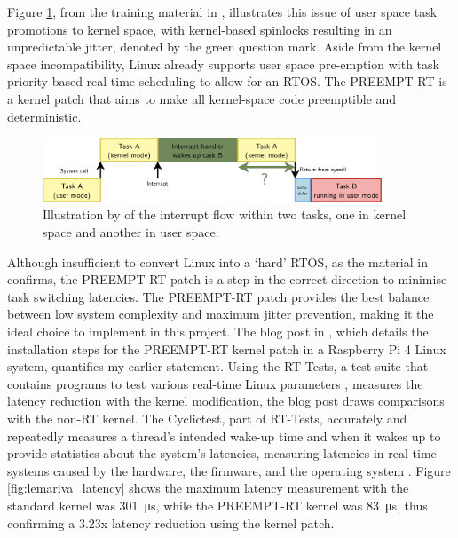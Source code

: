 Figure \ref{fig:bootlin_flow}, from the training material in \cite{bootlinUnderstandingLinuxRealtime2024}, illustrates this issue of user space task promotions to kernel space, with kernel-based spinlocks resulting in an unpredictable jitter, denoted by the green question mark. Aside from the kernel space incompatibility, Linux already supports user space pre-emption with task priority-based real-time scheduling to allow for an RTOS. The PREEMPT-RT is a kernel patch that aims to make all kernel-space code preemptible and deterministic.

\begin{figure}[h]
    \centering
    \includegraphics[width=0.9\textwidth]{assets/bootlin-interrupt-flow.png}
    \caption{Illustration by \cite{bootlinUnderstandingLinuxRealtime2024} of the interrupt flow within two tasks, one in kernel space and another in user space.}
    \label{fig:bootlin_flow}
\end{figure}

Although insufficient to convert Linux into a `hard' RTOS, as the material in \cite{bootlinUnderstandingLinuxRealtime2024} confirms, the PREEMPT-RT patch is a step in the correct direction to minimise task switching latencies. The PREEMPT-RT patch provides the best balance between low system complexity and maximum jitter prevention, making it the ideal choice to implement in this project. The blog post in \cite{maurorivaRaspberryPi4B2019}, which details the installation steps for the PREEMPT-RT kernel patch in a Raspberry Pi 4 Linux system, quantifies my earlier statement. Using the RT-Tests, a test suite that contains programs to test various real-time Linux parameters \cite{costashulRTTests2023}, measures the latency reduction with the kernel modification, the blog post \cite{maurorivaRaspberryPi4B2019} draws comparisons with the non-RT kernel. The Cyclictest, part of RT-Tests, accurately and repeatedly measures a thread's intended wake-up time and when it wakes up to provide statistics about the system's latencies, measuring latencies in real-time systems caused by the hardware, the firmware, and the operating system \cite{costashulCyclictest2023}. Figure \ref{fig:lemariva_latency} shows the maximum latency measurement with the standard kernel was \SI{301}{\micro\second}, while the PREEMPT-RT kernel was \SI{83}{\micro\second}, thus confirming a 3.23x latency reduction using the kernel patch.

